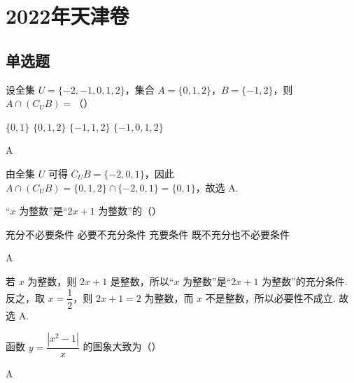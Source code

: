 \chapter{2022年天津卷}

\section{单选题}

\begin{problem}
设全集 \(U=\{-2,-1,0,1,2\}\)，集合 \(A=\{0,1,2\}\)，\(B=\{-1,2\}\)，则 \(A\cap\left(C_UB\right)=\)（\quad）

\choices
    {\(\{0,1\}\)}
    {\(\{0,1,2\}\)}
    {\(\{-1,1,2\}\)}
    {\(\{-1,0,1,2\}\)}
\end{problem}

\begin{answer}
A
\end{answer}

\begin{solution}
由全集 \(U\) 可得 \(C_UB=\{-2,0,1\}\)，因此
\(A\cap(C_UB)=\{0,1,2\}\cap\{-2,0,1\}=\{0,1\}\)，故选 A.
\end{solution}

\begin{problem}
“\(x\) 为整数”是“\(2x+1\) 为整数”的（\quad）

\choices
    {充分不必要条件}
    {必要不充分条件}
    {充要条件}
    {既不充分也不必要条件}
\end{problem}

\begin{answer}
A
\end{answer}

\begin{solution}
若 \(x\) 为整数，则 \(2x+1\) 是整数，所以“\(x\) 为整数”是“\(2x+1\) 为整数”的充分条件. 反之，取 \(x=\dfrac12\)，则 \(2x+1=2\) 为整数，而 \(x\) 不是整数，所以必要性不成立. 故选 A.
\end{solution}

\begin{problem}
函数 \(y=\dfrac{|x^2-1|}{x}\) 的图象大致为（\quad）

    {}
    {}
    {}
\end{problem}

\begin{answer}
A
\end{answer}

